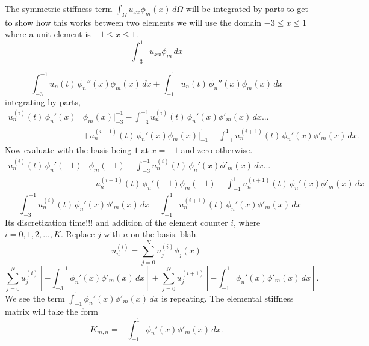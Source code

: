 \documentclass[12pt]{article}%
\begin{document}
The symmetric stiffness term $\int_\Omega u_{xx} \phi_m(x)\,d\Omega$ will be integrated by parts to get to show how this works between two elements we will use the domain $-3\leq x \leq 1$ where a unit element is $-1\leq x \leq 1$.
\begin{equation}
\int_{-3}^1 u_{xx} \phi_m\,dx
\end{equation}

\begin{equation}
\int_{-3}^{-1} u_n(t)\,\phi_n''(x) \phi_m(x)\,dx+\int_{-1}^1 u_n(t)\,\phi_n''(x) \phi_m(x)\,dx
\end{equation}
integrating by parts,
\begin{align}
u^{(i)}_n(t)\,\phi_n'(x)& \phi_m(x)\Big|_{-3}^{-1}-\int_{-3}^{-1} u^{(i)}_n(t)\,\phi_n'(x) \phi'_m(x)\,dx...\\
&+u_n^{(i+1)}(t)\,\phi_n'(x) \phi_m(x)\Big|_{-1}^{1}-\int_{-1}^{1} u^{(i+1)}_n(t)\,\phi_n'(x) \phi'_m(x)\,dx.\nonumber
\end{align}
Now evaluate with the basis being $1$ at $x=-1$ and zero otherwise.
\begin{align}
u_n^{(i)}(t)\,\phi_n'(-1)& \phi_m(-1)-\int_{-3}^{-1} u_n^{(i)}(t)\,\phi_n'(x) \phi'_m(x)\,dx...\\
&-u^{(i+1)}_n(t)\,\phi_n'(-1) \phi_m(-1)-\int_{-1}^{1} u_n^{(i+1)}(t)\,\phi_n'(x) \phi'_m(x)\,dx\nonumber
\end{align}
\begin{equation}
-\int_{-3}^{-1} u^{(i)}_n(t)\,\phi_n'(x) \phi'_m(x)\,dx-\int_{-1}^{1} u^{(i+1)}_n(t)\,\phi_n'(x) \phi'_m(x)\,dx
\end{equation}
Its discretization time!!! and addition of the element counter $i$, where $i=0,1,2,...,K$. Replace $j$ with $n$ on the basis. blah.
\begin{equation}
u^{(i)}_n=\sum_{j=0}^N u^{(i)}_j\phi_j(x)
\end{equation}
\begin{equation}
\sum_{j=0}^N u^{(i)}_j\left[-\int_{-3}^{-1} \phi_n'(x) \phi'_m(x)\,dx\right]+\sum_{j=0}^N u^{(i+1)}_j\left[-\int_{-1}^{1} \phi_n'(x) \phi'_m(x)\,dx\right].
\end{equation}
We see the term $\int_{-1}^{1} \phi_n'(x) \phi'_m(x)\,dx$ is repeating.
The elemental stiffness matrix will take the form
\begin{equation}
K_{m,n}=-\int_{-1}^{1} \phi_n'(x) \phi'_m(x)\,dx.
\end{equation}
\end{document}
